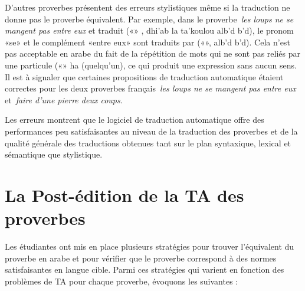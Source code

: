 \documentclass[french]{textolivre}
\begin{document}
D’autres proverbes présentent des erreurs stylistiques même si la traduction ne donne pas le proverbe équivalent. 
Par exemple, dans le proverbe \textit{les loups ne se mangent pas entre eux} et traduit 
(«» , dhi'ab la ta'koulou alb'd b'd), le pronom «se» et le complément «entre eux» 
sont traduits par («», alb'd b'd). Cela n’est pas acceptable en arabe du fait de la répétition 
de mots qui ne sont pas reliés par une particule («» ha (quelqu’un), ce qui produit une expression 
sans aucun sens. Il est à signaler que certaines propositions de traduction automatique étaient correctes pour les deux 
proverbes français \textit{les loups ne se mangent pas entre eux} et \textit{faire d’une pierre deux coups}.

Les erreurs montrent que le logiciel de traduction automatique offre des performances peu satisfaisantes au niveau de 
la traduction des proverbes et de la qualité générale des traductions obtenues tant sur le plan syntaxique, lexical et sémantique que stylistique. 

\section{La Post-édition de la TA des proverbes}\label{sec-organizacao-latex}
Les étudiantes ont mis en place plusieurs stratégies pour trouver l’équivalent du proverbe en arabe et pour vérifier que le proverbe correspond à des normes satisfaisantes en langue cible. Parmi ces stratégies qui varient en fonction des problèmes de TA pour chaque proverbe, évoquons les suivantes :
\end{document}
